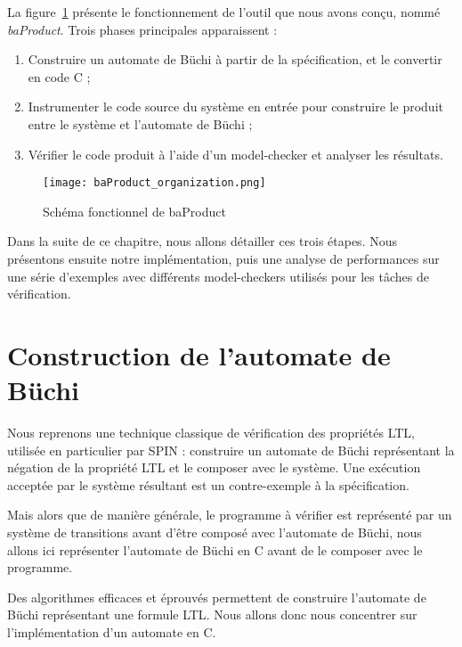 La figure~\ref{fig:baProduct_func} présente le fonctionnement de l'outil que
nous avons conçu, nommé \emph{baProduct}. Trois phases principales
apparaissent :

\begin{enumerate}
\def\labelenumi{\arabic{enumi})}
  \item Construire un automate de Büchi à partir de la spécification, et le
    convertir en code C ;
  \item Instrumenter le code source du système en entrée pour construire le
    produit entre le système et l'automate de Büchi ;
  \item Vérifier le code produit à l'aide d'un model-checker et analyser les
    résultats.
\end{enumerate}

\begin{figure}
\begin{center}
  \texttt{[image: baProduct\_organization.png]}
\end{center}
\caption{Schéma fonctionnel de baProduct}
\label{fig:baProduct_func}
\end{figure}

Dans la suite de ce chapitre, nous allons détailler ces trois étapes. Nous
présentons ensuite notre implémentation, puis une analyse de performances
sur une série d'exemples avec différents model-checkers utilisés pour les tâches
de vérification.

\section{Construction de l'automate de Büchi}

Nous reprenons une technique classique de vérification des propriétés \ac{LTL},
utilisée en particulier par SPIN\cite{SPIN} : construire un automate de Büchi
représentant la négation de la propriété \ac{LTL} et le composer avec le
système. Une exécution acceptée par le système résultant est un contre-exemple à
la spécification.

Mais alors que de manière générale, le programme à vérifier est représenté par
un système de transitions avant d'être composé avec l'automate de Büchi, nous
allons ici représenter l'automate de Büchi en C avant de le composer avec le
programme.

Des algorithmes efficaces et éprouvés permettent de construire l'automate de
Büchi représentant une formule \ac{LTL}\cite{ltl2ba}. Nous allons donc nous
concentrer sur l'implémentation d'un automate en C.

